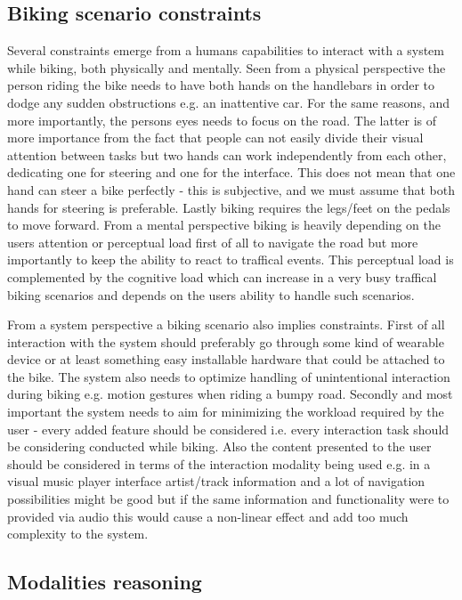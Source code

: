 \subsection{Biking scenario constraints}
Several constraints emerge from a humans capabilities to interact with a system while biking, both physically and mentally. Seen from a physical perspective the person riding the bike needs to have both hands on the handlebars in order to dodge any sudden obstructions e.g. an inattentive car. For the same reasons, and more importantly, the persons eyes needs to focus on the road. The latter is of more importance from the fact that people can not easily divide their visual attention between tasks \cite{brewster_overcoming_2002} but two hands can work independently from each other, dedicating one for steering and one for the interface. This does not mean that one hand can steer a bike perfectly - this is subjective, and we must assume that both hands for steering is preferable. Lastly biking requires the legs/feet on the pedals to move forward. From a mental perspective biking is heavily depending on the users attention or perceptual load first of all to navigate the road but more importantly to keep the ability to react to traffical events. This perceptual load is complemented by the cognitive load which can increase in a very busy traffical biking scenarios and depends on the users ability to handle such scenarios.

From a system perspective a biking scenario also implies constraints. First of all interaction with the system should preferably go through some kind of wearable device or at least something easy installable hardware that could be attached to the bike. The system also needs to optimize handling of unintentional interaction during biking e.g. motion gestures when riding a bumpy road. Secondly and most important the system needs to aim for minimizing the workload required by the user - every added feature should be considered i.e. every interaction task should be considering conducted while biking. Also the content presented to the user should be considered in terms of the interaction modality being used e.g. in a visual music player interface artist/track information and a lot of navigation possibilities might be good but if the same information and functionality were to provided via audio this would cause a non-linear effect and add too much complexity to the system.

\subsection{Modalities reasoning}

